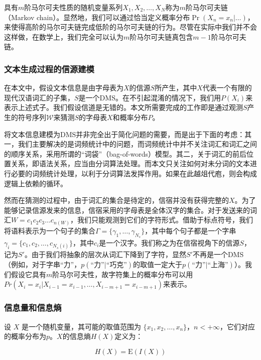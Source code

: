 \documentclass[UTF8]{ctexart}
\begin{document}
具有$m$阶马尔可夫性质的随机变量系列$X_1, X_2, \dots, X_N$称为$m$阶马尔可夫链（Markov chain）。显然地，我们可以通过恰当定义概率分布$\Pr(X_n=x_n|\dots)$，来使得高阶的马尔可夫链完成低阶的马尔可夫链的行为。尽管在实际中我们并不会这样做，在数学上，我们完全可以认为$m$阶马尔可夫链真包含$m-1$阶马尔可夫链。

\subsubsection{文本生成过程的信源建模}
\label{sec_generative_model}
在本文中，假设文本信息是由字母表为$X$的信源$S$所产生，其中$X$代表一个有限的现代汉语词汇的子集，$S$是一个DMS。在不引起混淆的情况下，我们用$P(X_i)$来表示上述式子。我们假设信道是无错的。本文所需要完成的工作即是通过观测$S$产生的符号序列$\mathcal{W}$来猜测$S$的字母表$X$和概率分布$P$。

将文本信息建模为DMS并非完全出于简化问题的需要，而是出于下面的考虑：其一，我们主要解决的是词频统计中的问题，而词频统计中并不关注词汇和词汇之间的顺序关系，采用所谓的“词袋”（bag-of-words）模型。其二，关于词汇的前后位置关系，即语法关系，应当由分词算法处理。而本文只关注如何对未分词的文本进行必要的词频统计处理，以利于分词算法发挥作用。如果在此越俎代庖，则会构成逻辑上依赖的循环。

然而在猜测的过程中，由于词汇的集合是待定的，信宿并没有获得完整的$X$。为了能够记录信源发来的信息，信宿采用的字母表是全体汉字的集合。对于发送来的词汇$W=c_1 c_2 c_3 \dots c_{n(W)}$，我们只能观测到它们的字符形式。借助于标点符号，我们将语料表示为一个句子的集合$\Gamma = \{ \gamma_1, \dots, \gamma_{N_s} \}$，其中每个句子都是一个字串$\gamma_i = \{ c_1, c_2, \dots, c_{N_s(i)} \}$，其中$c_i$是一个汉字。我们称之为在信宿视角下的信源$S$，记为$S'$。由于我们将抽象的层次从词汇下降到了字符，显然$S'$不再是一个DMS（例如，对于字串“力”，$p(\text{“力”}|\text{“巧克”})$的取值一定大于$p(\text{“力”}|\text{“上海”})$）。我们假设它具有$m$阶马尔可夫性，故字符集上的概率分布可以用$Pr(X_i=x_i|X_{i-1}=x_{i-1}, \dots, X_{i-m+1}=x_{i-m+1})$来表示。

\subsubsection{信息量和信息熵}

设 $X$ 是一个随机变量，其可能的取值范围为 $\{x_1, x_2, \dots, x_n\}$，$n < +\infty$，它们对应的概率分布为$p$。$X$的信息熵$H(X)$定义为：

\begin{equation}
H(X)=\text{E}(I(X))
\end{equation}
\end{document}

